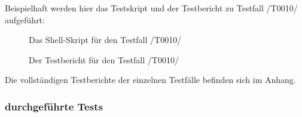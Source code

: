 \documentclass[11pt,a4paper]{scrartcl}
\begin{document}
Beispielhaft werden hier das Testskript und der Testbericht zu Testfall /T0010/ aufgeführt:

\begin{figure}[H]
\caption{Das Shell-Skript für den Testfall /T0010/}
\end{figure}

\begin{figure}[H]
\caption{Der Testbericht für den Testfall /T0010/}
\end{figure}

Die vollständigen Testberichte der einzelnen Testfälle befinden sich im Anhang.

\newpage

\subsubsection{durchgeführte Tests}
\end{document}
